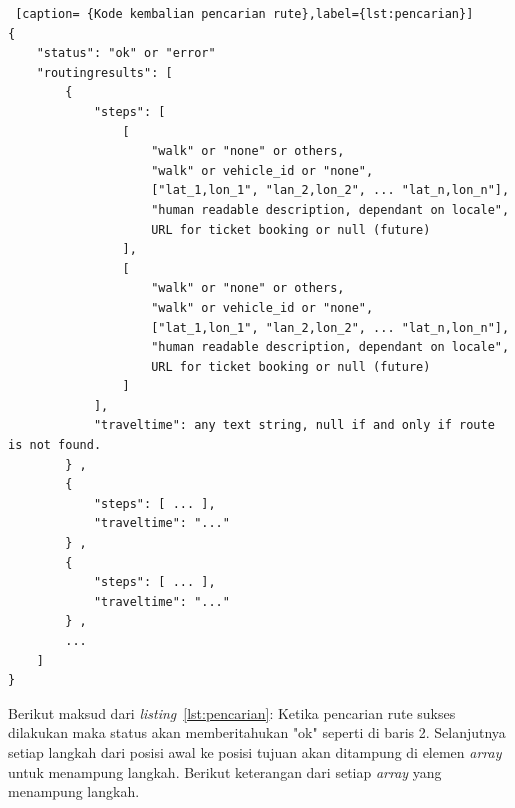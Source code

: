 \begin{lstlisting} [caption= {Kode kembalian pencarian rute},label={lst:pencarian}]
{ 
    "status": "ok" or "error" 
    "routingresults": [ 
        {
            "steps": [
                [
                    "walk" or "none" or others,
                    "walk" or vehicle_id or "none",
                    ["lat_1,lon_1", "lan_2,lon_2", ... "lat_n,lon_n"],
                    "human readable description, dependant on locale",
                    URL for ticket booking or null (future)
                ],
                [
                    "walk" or "none" or others,
                    "walk" or vehicle_id or "none",
                    ["lat_1,lon_1", "lan_2,lon_2", ... "lat_n,lon_n"],
                    "human readable description, dependant on locale",
                    URL for ticket booking or null (future)
                ]
            ],
            "traveltime": any text string, null if and only if route is not found.
        } ,
        {
            "steps": [ ... ],
            "traveltime": "..."
        } ,
        {
            "steps": [ ... ],
            "traveltime": "..."
        } ,
        ...     
    ]
}
\end{lstlisting}
Berikut maksud dari \textit{listing}~\ref{lst:pencarian}: \newline
\hspace{0.5cm} Ketika pencarian rute sukses dilakukan maka status akan memberitahukan "ok" seperti di baris 2. Selanjutnya setiap langkah dari posisi awal ke posisi tujuan akan ditampung di elemen \textit{array} untuk menampung langkah. Berikut keterangan dari setiap \textit{array} yang menampung langkah. 


